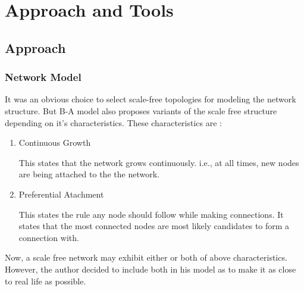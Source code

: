 
\chapter{Approach and Tools} %

\label{Chapter2} %



\section{Approach}


\subsection{Network Model}
It was an obvious choice to select scale-free topologies for modeling the network structure.  But B-A model also proposes variants of the scale free structure depending on it's characteristics. These characteristics are : 

\begin{enumerate}
\item Continuous Growth 

This states that the network grows continuously. i.e., at all times, new nodes are being attached to the the network.


\item Preferential Atachment

This states the rule any node should follow while making connections. It states that the most connected nodes are most likely candidates to form a connection with.


\end{enumerate} 

Now, a scale free network may exhibit either or both of above characteristics. However, the author decided to include both in his model as to make it as close to real life as possible. 

